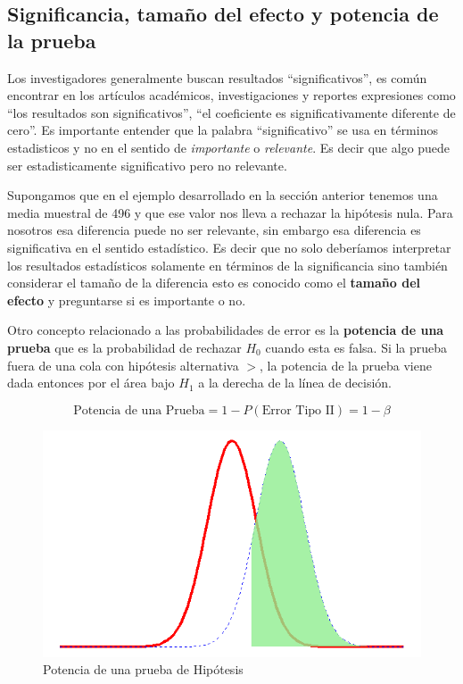 \documentclass[]{book}
\begin{document}
\subsection{Significancia, tamaño del efecto y potencia de la
prueba}\label{significancia-tamano-del-efecto-y-potencia-de-la-prueba}

Los investigadores generalmente buscan resultados ``significativos'', es
común encontrar en los artículos académicos, investigaciones y reportes
expresiones como ``los resultados son significativos'', ``el coeficiente
es significativamente diferente de cero''. Es importante entender que la
palabra ``significativo'' se usa en términos estadisticos y no en el
sentido de \emph{importante} o \emph{relevante}. Es decir que algo puede
ser estadisticamente significativo pero no relevante.

Supongamos que en el ejemplo desarrollado en la sección anterior tenemos
una media muestral de 496 y que ese valor nos lleva a rechazar la
hipótesis nula. Para nosotros esa diferencia puede no ser relevante, sin
embargo esa diferencia es significativa en el sentido estadístico. Es
decir que no solo deberíamos interpretar los resultados estadísticos
solamente en términos de la significancia sino también considerar el
tamaño de la diferencia esto es conocido como el \textbf{tamaño del
efecto} y preguntarse si es importante o no.

Otro concepto relacionado a las probabilidades de error es la
\textbf{potencia de una prueba} que es la probabilidad de rechazar
\(H_0\) cuando esta es falsa. Si la prueba fuera de una cola con
hipótesis alternativa \(>\), la potencia de la prueba viene dada
entonces por el área bajo \(H_1\) a la derecha de la línea de decisión.

\begin{equation} 
\text{Potencia de una Prueba}=1-P\left(\text{Error Tipo II}\right)=1-\beta
\label{eq:power}
\end{equation}

\begin{figure}[h]

{\centering \includegraphics[width=0.5\linewidth]{power} 

}

\caption{Potencia de una prueba de Hipótesis}\label{fig:power}
\end{figure}
\end{document}

